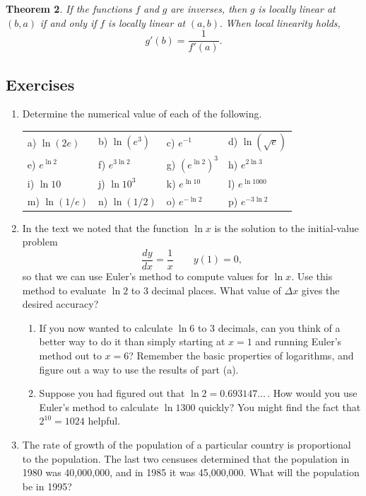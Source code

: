{\bf Theorem 2}.   {\it If the functions} $f$ {\it and} $g$ {\it are inverses, then} $g$ {\it is locally linear at} $(b,a)$ {\it if and only if} $f$ {\it is locally linear at} $(a,b)$.  {\it When local linearity holds,}
\[
g'(b) = \frac{1}{f'(a)}.
\]

\subsection{Exercises}
\label{subsec:exercises}



\begin{enumerate}
\item Determine the numerical value of each of the following.


\begin{tabular}{p{3cm}p{3cm}p{3cm}p{3cm}}
a) $\ln(2e)$ & b) $\ln(e^3)$ & c) $e^{-1}$ & 
	d) $\ln(\sqrt{e})$ 	\\ [2pt]
e) $e^{\ln 2}$ & f) $e^{3\ln 2}$ & g) $(e^{\ln 2})^3$ & 
	h) $e^{2\ln 3}$  \\[2pt]
i) $\ln 10$ & j) $\ln 10^3$  & k) $e^{\ln 10}$ & 
	l) $e^{\ln 1000}$  \\[2pt]
m) $\ln(1/e)$ & n) $\ln(1/2)$ & o) $e^{-\ln 2}$ & 
	p) $e^{-3\ln 2}$  
\end{tabular}


\item In the text we noted that the function $\ln{x}$ is the solution to the initial-value problem
	\[
\dfrac{dy}{dx} = \dfrac{1}{x} \qquad y(1) = 0,
\]
so that we can use Euler's method to compute values for $\ln{x}$.  Use this method to evaluate $\ln{2}$ to 3 decimal places.  What value of $\Delta x$ gives the desired accuracy?

  \begin{enumerate}
  \item If you now wanted to calculate $\ln{6}$ to 3 decimals, can you think of a better way to do it than simply starting at $x=1$ and running Euler's method out to $x=6$?  Remember the basic properties of logarithms, and figure out a way to use the results of part (a).

  \item Suppose you had figured out that $\ln{2}=0.693147\ldots$\,.  How would you use Euler's method to calculate $\ln{1300}$ quickly?  You might find the fact that $2^{10}=1024$ helpful.


\end{enumerate}
\item The rate of growth of the population of a particular country is proportional to
 the
population.  The last two censuses determined that the population in 1980 was
 40,000,000, and in 1985
it was 45,000,000.  What will the population be in 1995?



\end{enumerate}
